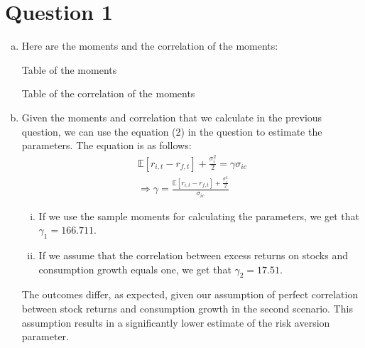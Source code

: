 
\section*{Question 1}
\begin{enumerate}[(a)]

  \item Here are the moments and the correlation of the moments:
  \begin{table}[htbp!]
    \centering
    \caption{Table of the moments}
    \label{tab:1a}
    
  \end{table}
  \begin{table}[htbp!]
    \centering
    \caption{Table of the correlation of the moments}
    \label{tab:1a_corr}
    
  \end{table}
  \item Given the moments and correlation that we calculate in the previous question, we can use the equation (2) in the question to estimate the parameters. The equation is as follows:
  \begin{gather*}
    \mathbb{E}[r_{i,t}-r_{f,t}] + \frac{\sigma^2_i}{2} = \gamma \sigma_{ic} \\
    \Rightarrow \gamma = \frac{\mathbb{E}[r_{i,t}-r_{f,t}] + \frac{\sigma^2_i}{2}}{\sigma_{ic}} 
  \end{gather*}
  \begin{enumerate}[i.]
   \item  If we use the sample moments for calculating the parameters, we get that $\gamma_1 = 166.711$.
   \item If we assume that the correlation between
   excess returns on stocks and consumption growth equals one, we get that $\gamma_2 = 17.51$.
  \end{enumerate}
  The outcomes differ, as expected, given our assumption of perfect correlation between stock returns and consumption growth in the second scenario. This assumption results in a significantly lower estimate of the risk aversion parameter. 




\end{enumerate}

